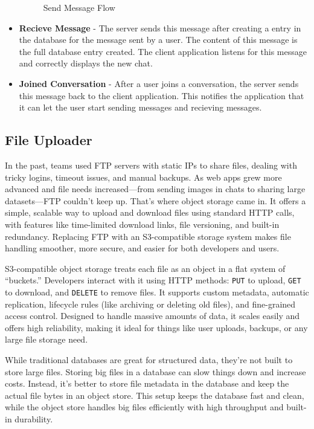 \begin{itemize}
\begin{figure}[H]
        \caption{Send Message Flow}
        \label{fig:send-message-flow}
    \end{figure}
    \item \textbf{Recieve Message} - The server sends this message after creating a entry in the database for the message sent by a user. The content of this message is the full database entry created. The client application listens for this message and correctly displays the new chat.
    \item \textbf{Joined Conversation} - After a user joins a conversation, the server sends this message back to the client application. This notifies the application that it can let the user start sending messages and recieving messages.
\end{itemize}

\subsection{File Uploader}
In the past, teams used FTP servers with static IPs to share files, dealing with tricky logins, timeout issues, and manual backups. As web apps grew more advanced and file needs increased—from sending images in chats to sharing large datasets—FTP couldn’t keep up. That’s where object storage came in. It offers a simple, scalable way to upload and download files using standard HTTP calls, with features like time-limited download links, file versioning, and built-in redundancy. Replacing FTP with an S3-compatible storage system makes file handling smoother, more secure, and easier for both developers and users.

S3-compatible object storage treats each file as an object in a flat system of “buckets.” Developers interact with it using HTTP methods: \texttt{PUT} to upload, \texttt{GET} to download, and \texttt{DELETE} to remove files. It supports custom metadata, automatic replication, lifecycle rules (like archiving or deleting old files), and fine-grained access control. Designed to handle massive amounts of data, it scales easily and offers high reliability, making it ideal for things like user uploads, backups, or any large file storage need.

While traditional databases are great for structured data, they’re not built to store large files. Storing big files in a database can slow things down and increase costs. Instead, it’s better to store file metadata in the database and keep the actual file bytes in an object store. This setup keeps the database fast and clean, while the object store handles big files efficiently with high throughput and built-in durability.

